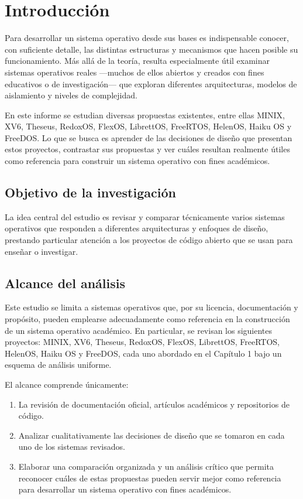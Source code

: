 \chapter*{Introducción}

Para desarrollar un sistema operativo desde sus bases es indispensable conocer, con suficiente detalle, las distintas estructuras y mecanismos que hacen posible su funcionamiento. Más allá de la teoría, resulta especialmente útil examinar sistemas operativos reales —muchos de ellos abiertos y creados con fines educativos o de investigación— que exploran diferentes arquitecturas, modelos de aislamiento y niveles de complejidad.

En este informe se estudian diversas propuestas existentes, entre ellas MINIX, XV6, Theseus, RedoxOS, FlexOS, LibrettOS, FreeRTOS, HelenOS, Haiku OS y FreeDOS. Lo que se busca es aprender de las decisiones de diseño que presentan estos proyectos, contrastar sus propuestas y ver cuáles resultan realmente útiles como referencia para construir un sistema operativo con fines académicos.

\section*{Objetivo de la investigación}

La idea central del estudio es revisar y comparar técnicamente varios sistemas operativos que responden a diferentes arquitecturas y enfoques de diseño, prestando particular atención a los proyectos de código abierto que se usan para enseñar o investigar.

\section*{Alcance del análisis}

Este estudio se limita a sistemas operativos que, por su licencia, documentación y propósito, pueden emplearse adecuadamente como referencia en la construcción de un sistema operativo académico. En particular, se revisan los siguientes proyectos: MINIX, XV6, Theseus, RedoxOS, FlexOS, LibrettOS, FreeRTOS, HelenOS, Haiku OS y FreeDOS, cada uno abordado en el Capítulo 1 bajo un esquema de análisis uniforme.

El alcance comprende únicamente:

\begin{enumerate}
\item La revisión de documentación oficial, artículos académicos y repositorios de código.
\item Analizar cualitativamente las decisiones de diseño que se tomaron en cada uno de los sistemas revisados.
\item Elaborar una comparación organizada y un análisis crítico que permita reconocer cuáles de estas propuestas pueden servir mejor como referencia para desarrollar un sistema operativo con fines académicos.
\end{enumerate}

